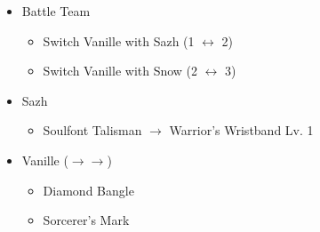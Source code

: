\begin{multicols}{2}
\begin{menu}
\begin{itemize}
    \paradigm
    \begin{itemize}
        \item Battle Team
        \begin{itemize}
            \item Switch Vanille with Sazh (1 $\leftrightarrow$ 2)
            \item Switch Vanille with Snow (2 $\leftrightarrow$ 3)
        \end{itemize}
    \end{itemize}
    \equip
    \begin{itemize}
        \item Sazh
        \begin{itemize}
                \item Soulfont Talisman $\rightarrow$ Warrior's Wristband Lv. 1
        \end{itemize}
        \item Vanille ($\rightarrow\rightarrow$)
        \begin{itemize}
                \item Diamond Bangle
                \item Sorcerer's Mark
        \end{itemize}
    \end{itemize}
\end{itemize}
\end{menu}


\end{multicols}

